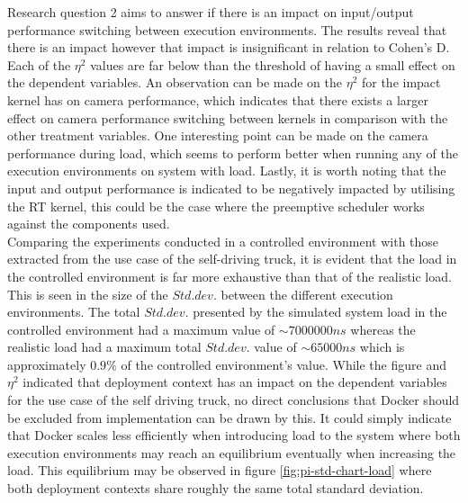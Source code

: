 Research question 2 aims to answer if there is an impact on input/output performance switching between execution environments. The results reveal that there is an impact however that impact is insignificant in relation to Cohen's D. Each of the $\eta^{2}$ values are far below than the threshold of having a small effect on the dependent variables. An observation can be made on the $\eta^{2}$ for the impact kernel has on camera performance, which indicates that there exists a larger effect on camera performance switching between kernels in comparison with the other treatment variables. One interesting point can be made on the camera performance during load, which seems to perform better when running any of the execution environments on system with load. Lastly, it is worth noting that the input and output performance is indicated to be negatively impacted by utilising the RT kernel, this could be the case where the preemptive scheduler works against the components used.\\

Comparing the experiments conducted in a controlled environment with those extracted from the use case of the self-driving truck, it is evident that the load in the controlled environment is far more exhaustive than that of the realistic load. This is seen in the size of the $Std.dev.$ between the different execution environments. The total $Std.dev.$ presented by the simulated system load in the controlled environment had a maximum value of $\sim7000000ns$ whereas the realistic load had a maximum total $Std.dev.$ value of $\sim65000ns$ which is approximately $0.9\%$ of the controlled environment's value. While the figure and $\eta^{2}$ indicated that deployment context has an impact on the dependent variables for the use case of the self driving truck, no direct conclusions that Docker should be excluded from implementation can be drawn by this. It could simply indicate that Docker scales less efficiently when introducing load to the system where both execution environments may reach an equilibrium eventually when increasing the load. This equilibrium may be observed in figure \ref{fig:pi-std-chart-load} where both deployment contexts share roughly the same total standard deviation.\\